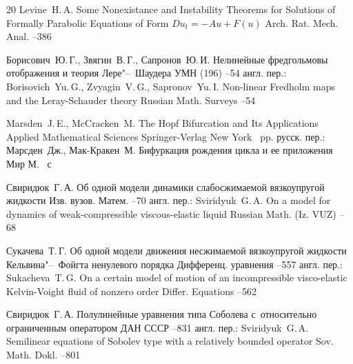 \begin{thebibliography}{20}
\by Levine~H.\,A.
\paper Some Nonexistance  and Instability Theorems for Solutions of Formally Parabolic Equations of Form $Du_t=-Au+F(u)$ 
\jour Arch. Rat. Mech. Anal.
--386

\by Борисович~Ю.\,Г., Звягин~В.\,Г., Сапронов~Ю.\,И.
\paper Нелинейные фредгольмовы отображения и теория Лере"--~Шаудера
\jour УМН
(196)
--54
\transl
англ. пер.:
\by Borisovich~Yu.\,G., Zvyagin~V.\,G., Sapronov~Yu.\,I.
\paper Non-linear Fredholm maps and the Leray-Schauder theory
\jour Russian Math. Surveys
--54



\by Marsden~J.\,E., McCracken~M.
\paper The Hopf Bifurcation and Its Applications
\serial Applied Mathematical Sciences
\publ Springer-Verlag
\publaddr New York
~pp.
\rtransl
русск. пер.:
\by Марсден~Дж., Мак-Кракен~М.
\book Бифуркация рождения цикла и ее приложения
\publ Мир
\publaddr М.
~с


\by Свиридюк~Г.\,А.
\paper Об одной модели динамики слабосжимаемой вязкоупругой жидкости
\jour Изв. вузов. Матем.
--70
\transl
англ. пер.:
\by Sviridyuk~G.\,A.
\paper On a model for dynamics of weak-compressible viscous-elastic liquid
\jour Russian Math. (Iz. VUZ)
--68

\by Сукачева~Т.\,Г.
\paper Об одной модели движения несжимаемой вязкоупругой жидкости  Кельвина"--~Фойгта ненулевого порядка 
\jour Дифференц. уравнения
--557
\transl
англ. пер.:
\by Sukacheva~T.\,G.
\paper On a certain model of motion of an incompressible visco-elastic Kelvin-Voight fluid of nonzero order
\jour Differ. Equations 
--562 

\by Свиридюк~Г.\,А.
\paper Полулинейные уравнения типа Соболева с~относительно ограниченным оператором 
\jour ДАН СССР
--831
\transl
англ. пер.:
\by Sviridyuk~G.\,A.
\paper Semilinear equations of Sobolev type with a relatively bounded operator
\jour Sov. Math. Dokl. 
--801 


\end{thebibliography}

\newpage 

